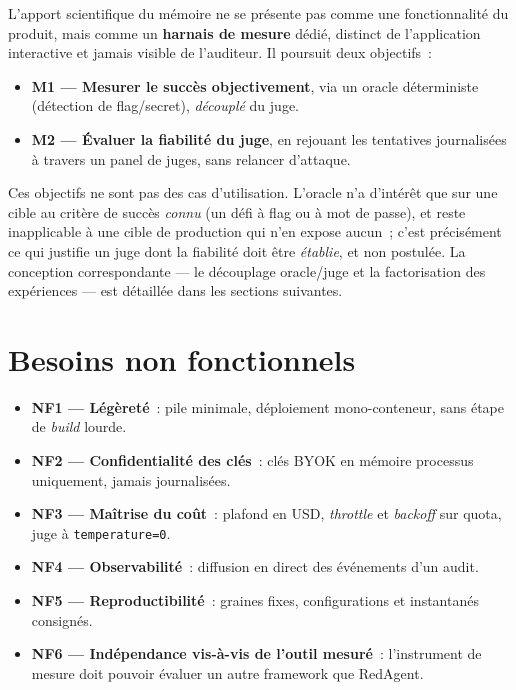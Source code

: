 L'apport scientifique du mémoire ne se présente pas comme une fonctionnalité du produit, mais comme un \textbf{harnais de mesure} dédié, distinct de l'application interactive et jamais visible de l'auditeur. Il poursuit deux objectifs~:

\begin{itemize}
  \item \textbf{M1 --- Mesurer le succès objectivement}, via un oracle déterministe (détection de flag/secret), \emph{découplé} du juge.
  \item \textbf{M2 --- Évaluer la fiabilité du juge}, en rejouant les tentatives journalisées à travers un panel de juges, sans relancer d'attaque.
\end{itemize}

\noindent Ces objectifs ne sont pas des cas d'utilisation. L'oracle n'a d'intérêt que sur une cible au critère de succès \emph{connu} (un défi à flag ou à mot de passe), et reste inapplicable à une cible de production qui n'en expose aucun~; c'est précisément ce qui justifie un juge dont la fiabilité doit être \emph{établie}, et non postulée. La conception correspondante — le découplage oracle/juge et la factorisation des expériences — est détaillée dans les sections suivantes.

\section{Besoins non fonctionnels}

\begin{itemize}
  \item \textbf{NF1 --- Légèreté}~: pile minimale, déploiement mono-conteneur, sans étape de \emph{build} lourde.
  \item \textbf{NF2 --- Confidentialité des clés}~: clés BYOK en mémoire processus uniquement, jamais journalisées.
  \item \textbf{NF3 --- Maîtrise du coût}~: plafond en USD, \emph{throttle} et \emph{backoff} sur quota, juge à \texttt{temperature=0}.
  \item \textbf{NF4 --- Observabilité}~: diffusion en direct des événements d'un audit.
  \item \textbf{NF5 --- Reproductibilité}~: graines fixes, configurations et instantanés consignés.
  \item \textbf{NF6 --- Indépendance vis-à-vis de l'outil mesuré}~: l'instrument de mesure doit pouvoir évaluer un autre framework que RedAgent.
\end{itemize}

